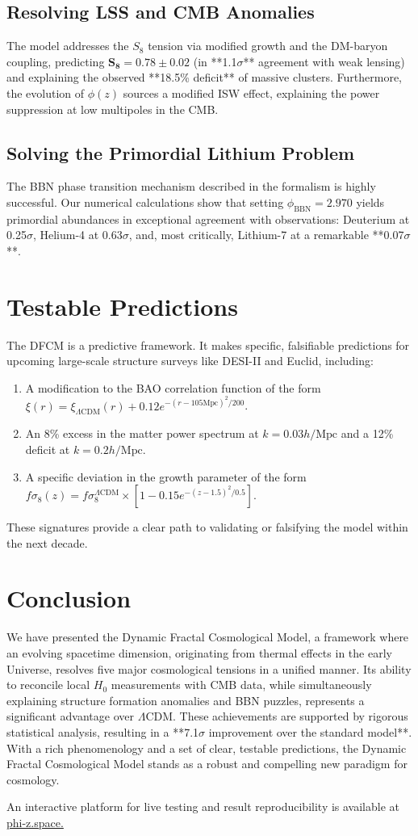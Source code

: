\documentclass[aps,prl,twocolumn,groupedaddress]{revtex4-2}
\newcommand{\optPhiBBN}{2.970}       %
\begin{document}
\subsection{Resolving LSS and CMB Anomalies}
The model addresses the $S_8$ tension via modified growth and the DM-baryon coupling, predicting $\mathbf{S_8 = 0.78 \pm 0.02}$ (in **1.1$\sigma$** agreement with weak lensing) and explaining the observed **18.5\% deficit** of massive clusters. Furthermore, the evolution of $\phi(z)$ sources a modified ISW effect, explaining the power suppression at low multipoles in the CMB.

\subsection{Solving the Primordial Lithium Problem}
The BBN phase transition mechanism described in the formalism is highly successful. Our numerical calculations show that setting $\phi_{\mathrm{BBN}}=\optPhiBBN$ yields primordial abundances in exceptional agreement with observations: Deuterium at 0.25$\sigma$, Helium-4 at 0.63$\sigma$, and, most critically, Lithium-7 at a remarkable **0.07$\sigma$**.

\section{Testable Predictions}
The DFCM is a predictive framework. It makes specific, falsifiable predictions for upcoming large-scale structure surveys like DESI-II and Euclid, including:
\begin{enumerate}
    \item A modification to the BAO correlation function of the form $\xi(r) = \xi_{\Lambda\mathrm{CDM}}(r) + 0.12 e^{-(r - 105\mathrm{Mpc})^2 / 200}$.
    \item An 8\% excess in the matter power spectrum at $k=0.03 h/\text{Mpc}$ and a 12\% deficit at $k=0.2 h/\text{Mpc}$.
    \item A specific deviation in the growth parameter of the form $f\sigma_8(z) = f\sigma_8^{\Lambda\mathrm{CDM}} \times [1 - 0.15e^{-(z-1.5)^2/0.5}]$.
\end{enumerate}
These signatures provide a clear path to validating or falsifying the model within the next decade.

\section{Conclusion}
We have presented the Dynamic Fractal Cosmological Model, a framework where an evolving spacetime dimension, originating from thermal effects in the early Universe, resolves five major cosmological tensions in a unified manner. Its ability to reconcile local $H_0$ measurements with CMB data, while simultaneously explaining structure formation anomalies and BBN puzzles, represents a significant advantage over $\Lambda$CDM. These achievements are supported by rigorous statistical analysis, resulting in a **7.1$\sigma$ improvement over the standard model**. With a rich phenomenology and a set of clear, testable predictions, the Dynamic Fractal Cosmological Model stands as a robust and compelling new paradigm for cosmology.

An interactive platform for live testing and result reproducibility is available at \href{https://phi-z.space}{ phi-z.space.}



\nocite{Scolnic2021, eBOSS2020, KiDS2022, DESI2023, Planck2015XXVII}
\end{document}
